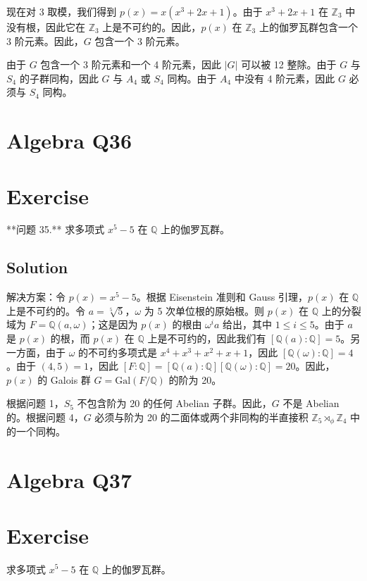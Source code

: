 \documentclass[12pt]{book}
\begin{document}
现在对 3 取模，我们得到 $p(x) = x(x^3 + 2x + 1)$。由于 $x^3 + 2x + 1$ 在 $\mathbb{Z}_3$ 中没有根，因此它在 $\mathbb{Z}_3$ 上是不可约的。因此，$p(x)$ 在 $\mathbb{Z}_3$ 上的伽罗瓦群包含一个 3 阶元素。因此，$G$ 包含一个 3 阶元素。

由于 $G$ 包含一个 3 阶元素和一个 4 阶元素，因此 $|G|$ 可以被 12 整除。由于 $G$ 与 $S_4$ 的子群同构，因此 $G$ 与 $A_4$ 或 $S_4$ 同构。由于 $A_4$ 中没有 4 阶元素，因此 $G$ 必须与 $S_4$ 同构。
\newpage
\section{Algebra Q36}
\section*{Exercise}
**问题 35.** 求多项式 $x^5 - 5$ 在 $\mathbb{Q}$ 上的伽罗瓦群。



\subsection*{Solution}
解决方案：令 $p(x) = x^5 - 5$。根据 Eisenstein 准则和 Gauss 引理，$p(x)$ 在 $\mathbb{Q}$ 上是不可约的。令 $a = \sqrt[5]{5}$，$\omega$ 为 5 次单位根的原始根。则 $p(x)$ 在 $\mathbb{Q}$ 上的分裂域为 $F = \mathbb{Q}(a,\omega)$；这是因为 $p(x)$ 的根由 $\omega^i a$ 给出，其中 $1 \le i \le 5$。由于 $a$ 是 $p(x)$ 的根，而 $p(x)$ 在 $\mathbb{Q}$ 上是不可约的，因此我们有 $[\mathbb{Q}(a): \mathbb{Q}] = 5$。另一方面，由于 $\omega$ 的不可约多项式是 $x^4+x^3+x^2+x+1$，因此 $[\mathbb{Q}(\omega) : \mathbb{Q}] = 4$。由于 $(4,5) = 1$，因此 $[F: \mathbb{Q}] = [\mathbb{Q}(a) : \mathbb{Q}][\mathbb{Q}(\omega) : \mathbb{Q}] = 20$。因此，$p(x)$ 的 Galois 群 $G = \text{Gal}(F/\mathbb{Q})$ 的阶为 20。

根据问题 1，$S_5$ 不包含阶为 20 的任何 Abelian 子群。因此，$G$ 不是 Abelian 的。根据问题 4，$G$ 必须与阶为 20 的二面体或两个非同构的半直接积 $\mathbb{Z}_5 \rtimes_\phi \mathbb{Z}_4$ 中的一个同构。
\newpage
\section{Algebra Q37}
\section*{Exercise}
求多项式 $x^5 - 5$ 在 $\mathbb{Q}$ 上的伽罗瓦群。
\end{document}
